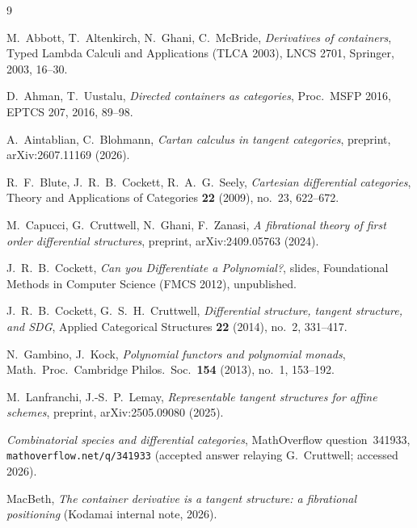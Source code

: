 \documentclass[11pt]{article}
\theoremstyle{definition}
\begin{document}
\begin{thebibliography}{9}

M.~Abbott, T.~Altenkirch, N.~Ghani, C.~McBride,
\emph{Derivatives of containers},
Typed Lambda Calculi and Applications (TLCA 2003), LNCS 2701, Springer, 2003, 16--30.

D.~Ahman, T.~Uustalu,
\emph{Directed containers as categories},
Proc.\ MSFP 2016, EPTCS 207, 2016, 89--98.

A.~Aintablian, C.~Blohmann,
\emph{Cartan calculus in tangent categories},
preprint, arXiv:2607.11169 (2026).

R.~F.~Blute, J.~R.~B.~Cockett, R.~A.~G.~Seely,
\emph{Cartesian differential categories},
Theory and Applications of Categories \textbf{22} (2009), no.~23, 622--672.

M.~Capucci, G.~Cruttwell, N.~Ghani, F.~Zanasi,
\emph{A fibrational theory of first order differential structures},
preprint, arXiv:2409.05763 (2024).

J.~R.~B.~Cockett,
\emph{Can you Differentiate a Polynomial?},
slides, Foundational Methods in Computer Science (FMCS 2012), unpublished.

J.~R.~B.~Cockett, G.~S.~H.~Cruttwell,
\emph{Differential structure, tangent structure, and SDG},
Applied Categorical Structures \textbf{22} (2014), no.~2, 331--417.

N.~Gambino, J.~Kock,
\emph{Polynomial functors and polynomial monads},
Math.\ Proc.\ Cambridge Philos.\ Soc.\ \textbf{154} (2013), no.~1, 153--192.

M.~Lanfranchi, J.-S.~P.~Lemay,
\emph{Representable tangent structures for affine schemes},
preprint, arXiv:2505.09080 (2025).

\emph{Combinatorial species and differential categories},
MathOverflow question~341933, \texttt{mathoverflow.net/q/341933} (accepted answer relaying
G.~Cruttwell; accessed 2026).

MacBeth,
\emph{The container derivative is a tangent structure: a fibrational positioning}
(Kodamai internal note, 2026).

\end{thebibliography}
\end{document}
